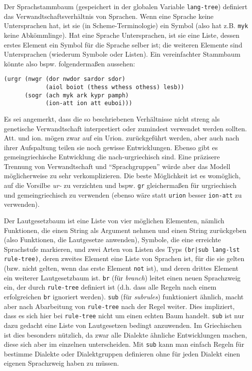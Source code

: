 \documentclass[12pt,a4paper,normalheadings]{scrartcl}
\def\tt#1{\texttt{#1}}
\begin{document}
Der Sprachstammbaum (gespeichert in der globalen Variable \tt{lang-tree})
definiert das Verwandtschaftsverhältnis von Sprachen.
Wenn eine Sprache keine Untersprachen hat,
ist sie (in Scheme-Terminologie) ein Symbol
(also hat z.B. \tt{myk} keine Abkömmlinge).
Hat eine Sprache Untersprachen,
ist sie eine Liste, dessen erstes Element ein Symbol für die Sprache selber ist;
die weiteren Elemente sind Untersprachen (wiederum Symbole oder Listen).
Ein vereinfachter Stammbaum könnte also bspw. folgendermaßen aussehen:
\begin{verbatim}
(urgr (nwgr (dor nwdor sardor sdor)
            (aiol boiot (thess wthess othess) lesb))
      (sogr (ach myk ark kypr pamph)
            (ion-att ion att euboi)))
\end{verbatim}
Es sei angemerkt,
dass die so beschriebenen Verhältnisse nicht streng als genetische
Verwandtschaft interpretiert oder zumindest verwendet werden sollten.
%
%
Att. und ion. mögen zwar auf ein Urion. zurückgeführt werden,
aber auch nach ihrer Aufspaltung teilen sie noch gewisse Entwicklungen.
Ebenso gibt es gemeingriechische Entwicklung die nach-urgriechisch sind.
Eine präzisere Trennung von Verwandtschaft und ``Sprachgruppen''
würde aber das Modell möglicherweise zu sehr verkomplizieren.
Die beste Möglichkeit ist es womöglich,
auf die Vorsilbe \textit{ur-} zu verzichten und bspw. \tt{gr}
gleichermaßen für urgriechisch und gemeingriechisch zu verwenden
(ebenso wäre statt \tt{urion} besser \tt{ion-att} zu verwenden).
%
%

Der Lautgesetzbaum ist eine Liste von vier möglichen Elementen, nämlich
Funktionen, die einen String als Argument nehmen und einen String zurückgeben
(also Funktionen, die Lautgesetze anwenden),
Symbole, die eine erreichte Sprachstufe markieren,
und zwei Arten von Listen des Typs \tt{(br|sub lang-lst rule-tree)},
deren zweites Element eine Liste von Sprachen ist,
für die sie gelten (bzw. nicht gelten, wenn das erste Element \tt{not} ist),
und deren drittes Element ein weiterer Lautgesetzbaum ist.
\tt{br} (für \emph{branch}) leitet einen neuen Sprachzweig ein,
der durch \tt{rule-tree} definiert ist
(d.h. dass alle Regeln nach einem erfolgreichen \tt{br} ignoriert werden).
\tt{sub} (für \emph{subrules}) funktioniert ähnlich,
macht aber nach Abarbeitung von \tt{rule-tree}
nach der Regel weiter.
Dies impliziert,
dass es sich hier bei \tt{rule-tree} nicht um einen echten Baum handelt.
\tt{sub} ist nur dazu gedacht eine Liste von Lautgesetzen bedingt anzuwenden.
Im Griechischen ist dies besonders nützlich,
da zwar alle Dialekte ähnliche Entwicklungen machen,
diese sich aber im einzelnen unterscheiden.
Mit \tt{sub} kann man einfach Regeln für bestimme Dialekte oder
Dialektgruppen definieren ohne für jeden Dialekt einen eigenen Sprachzweig
haben zu müssen.
\end{document}
